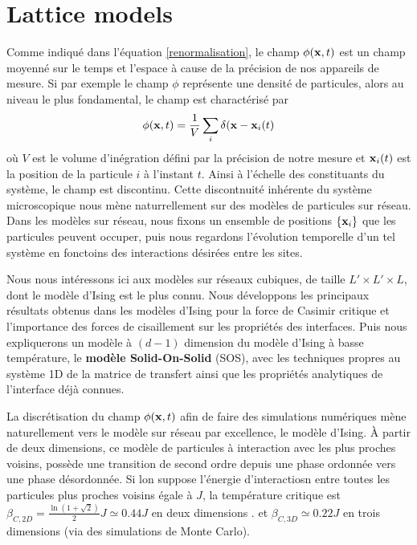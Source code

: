     \section{Lattice models}
Comme indiqué dans l'équation \ref{renormalisation},  le champ $\phi({\bf x},t)$ est un champ moyenné sur le temps et l'espace à cause de la précision de nos appareils de mesure. Si par exemple le champ $\phi$ représente une densité de particules, alors au niveau le plus fondamental, le champ est charactérisé par
\begin{align}
    \phi({\bf x},t) = \frac{1}{V} \sum_i \delta({\bf x}-{\bf x}_i(t) 
\end{align}
où $V$ est le volume d'inégration défini par la précision de notre mesure et ${\bf x}_i(t)$ est la position de la particule $i$ à l'instant $t$.  Ainsi à l'échelle des constituants du système, le champ est discontinu. Cette discontnuité inhérente du système microscopique nous mène naturrellement sur des modèles de particules sur réseau. 
Dans les modèles sur réseau, nous fixons un ensemble de positions $\{{\bf x}_i\}$ que les particules peuvent occuper, puis nous regardons l'évolution temporelle d'un tel système en fonctoins des interactions désirées entre les sites.

Nous nous intéressons ici aux modèles sur réseaux cubiques, de taille $L' \times L' \times L$, dont le modèle d'Ising est le plus connu. Nous développons les principaux résultats obtenus dans les modèles d'Ising pour la force de Casimir critique et l'importance des forces de cisaillement sur les propriétés des interfaces.
Puis nous expliquerons un modèle à $(d-1)$ dimension du modèle d'Ising à basse température, le \textbf{modèle Solid-On-Solid} (SOS), avec les techniques propres au système 1D de la matrice de transfert ainsi que les propriétés analytiques de l'interface déjà connues.
 
La discrétisation du champ $\phi({\bf x},t)$ afin de faire des simulations numériques mène naturellement vers le modèle sur réseau par excellence, le modèle d'Ising. À partir de deux dimensions, ce modèle de particules à interaction avec les plus proches voisins, possède une transition de second ordre depuis une phase ordonnée vers une phase désordonnée. Si lon suppose l'énergie d'interactiosn entre toutes les particules plus proches voisins égale à $J$, la température critique est $\beta_{C,2D} =  \frac{\ln(1+\sqrt{2})}{2} J \simeq 0.44 J$ en deux dimensions \cite{onsager_crystal_1944}. et $\beta_{C,3D} \simeq 0.22 J$ en trois dimensions \cite{talapov_magnetization_1996} (via des simulations de Monte Carlo).

